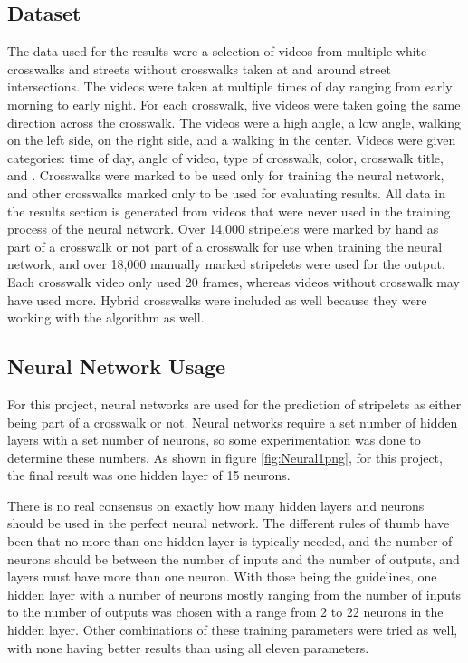 \documentclass[12pt]{ucthesis}
\begin{document}
\subsection{Dataset}
The data used for the results were a selection of videos from multiple white crosswalks and streets without crosswalks taken at and around street intersections. The videos were taken at multiple times of day ranging from early morning to early night. For each crosswalk, five videos were taken going the same direction across the crosswalk. The videos were a high angle, a low angle, walking on the left side, on the right side, and a walking in the center.  Videos were given categories: time of day, angle of video, type of crosswalk, color, crosswalk title, and . Crosswalks were marked to be used only for training the neural network, and other crosswalks marked only to be used for evaluating results. All data in the results section is generated from videos that were never used in the training process of the neural network. Over 14,000 stripelets were marked by hand as part of a crosswalk or not part of a crosswalk for use when training the neural network, and over 18,000 manually marked stripelets were used for the output. Each crosswalk video only used 20 frames, whereas videos without crosswalk may have used more. Hybrid crosswalks were included as well because they were working with the algorithm as well. 


\subsection{Neural Network Usage}
For this project, neural networks are used for the prediction of stripelets as either being part of a crosswalk or not. Neural networks require a set number of hidden layers with a set number of neurons, so some experimentation was done to determine these numbers. As shown in figure \ref{fig:Neural1png}, for this project, the final result was one hidden layer of 15 neurons. 


There is no real consensus on exactly how many hidden layers and neurons should be used in the perfect neural network. The different rules of thumb\cite{Heaton:2008:INN:1502373} have been that no more than one hidden layer is typically needed, and the number of neurons should be between the number of inputs and the number of outputs, and layers must have more than one neuron. With those being the guidelines, one hidden layer with a number of neurons mostly ranging from the number of inputs to the number of outputs was chosen with a range from 2 to 22 neurons in the hidden layer. Other combinations of these training parameters were tried as well, with none having better results than using all eleven parameters. 
\end{document}
